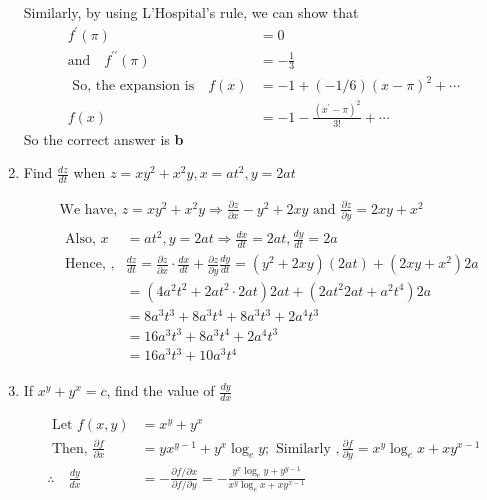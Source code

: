 \begin{enumerate}
\begin{answer}
		Similarly, by using L'Hospital's rule, we can show that
		\begin{align*}
		f^{\prime}(\pi)&=0\\\text{and} \quad f^{\prime \prime}(\pi)&=-\frac{1}{3}\\
		\text{	So, the expansion is}\quad f(x)&=-1+(-1 / 6)(x-\pi)^{2}+\cdots\\
		f(x)&=-1-\frac{\left(x^{\prime}-\pi\right)^{2}}{3 !}+\cdots
		\end{align*}
		So the correct answer is {\textbf{b}}
	\end{answer}
	
	\item Find $\frac{d z}{d t}$ when $z=x y^{2}+x^{2} y, x=a t^{2}, y=2 a t$
	\begin{answer}
		\begin{align*}
		&\text { We have, } z=x y^{2}+x^{2} y \Rightarrow \frac{\partial z}{\partial x}-y^{2}+2 x y \text { and } \frac{\partial z}{\partial y}=2 x y+x^{2}\\
		&\begin{aligned}
		\text { Also, } x &=a t^{2}, y=2 a t \Rightarrow \frac{d x}{d t}=2 a t, \frac{d y}{d t}=2 a \\
		\text { Hence, }, & \frac{d z}{d t}=\frac{\partial z}{\partial x} \cdot \frac{d x}{d t}+\frac{\partial z}{\partial y} \frac{d y}{d t}=\left(y^{2}+2 x y\right)(2 a t)+\left(2 x y+x^{2}\right) 2 a \\
		&=\left(4 a^{2} t^{2}+2 a t^{2} \cdot 2 a t\right) 2 a t+\left(2 a t^{2} 2 a t+a^{2} t^{4}\right) 2 a \\
		&=8 a^{3} t^{3}+8 a^{3} t^{4}+8 a^{3} t^{3}+2 a^{4} t^{3}\\&=16 a^{3} t^{3}+8 a^{3} t^{4}+2 a^{4} t^{3}\\&=16 a^{3} t^{3}+10 a^{3} t^{4}
		\end{aligned}
		\end{align*}
	\end{answer}
	\item 
	If  $x^{y}+y^{x}=c$,  find the value of $ \frac{d y}{d x}$
	
	
	\begin{answer}
		\begin{align*}
		\text { Let } f(x, y)&=x^{y}+y^{x}\\
		\text { Then, } \frac{\partial f}{\partial x}&=y x^{y-1}+y^{x} \log _{e} y ; \text { Similarly }, \frac{\partial f}{\partial y}=x^{y} \log _{e} x+x y^{x-1}\\
		\therefore \quad \frac{d y}{d x}&=-\frac{\partial f / \partial x}{\partial f / \partial y}=-\frac{y^{x} \log _{e} y+y^{y-1}}{x^{y} \log _{e} x+x y^{x-1}}
		\end{align*}
		
	\end{answer}
	
\end{enumerate}

